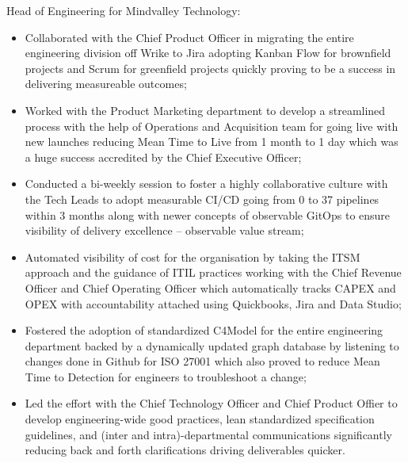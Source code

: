 \documentclass[11pt,a4paper,nolmodern,colorlinks=true,linkcolor=true]{moderncv}
\begin{document}
%
  {Head of Engineering for Mindvalley Technology:
    \begin{itemize}
      \item Collaborated with the Chief Product Officer in migrating the entire engineering division off Wrike to Jira adopting Kanban Flow for brownfield projects and Scrum for greenfield projects quickly proving to be a success in delivering measureable outcomes;
      \item Worked with the Product Marketing department to develop a streamlined process with the help of Operations and Acquisition team for going live with new launches reducing Mean Time to Live from 1 month to 1 day which was a huge success accredited by the Chief Executive Officer;
      \item Conducted a bi-weekly session to foster a highly collaborative culture with the Tech Leads to adopt measurable CI/CD going from 0 to 37 pipelines within 3 months along with newer concepts of observable GitOps to ensure visibility of delivery excellence -- observable value stream;
      \item Automated visibility of cost for the organisation by taking the ITSM approach and the guidance of ITIL practices working with the Chief Revenue Officer and Chief Operating Officer which automatically tracks CAPEX and OPEX with accountability attached using Quickbooks, Jira and Data Studio;
      \item Fostered the adoption of standardized C4Model for the entire engineering department backed by a dynamically updated graph database by listening to changes done in Github for ISO 27001 which also proved to reduce Mean Time to Detection for engineers to troubleshoot a change;
      \item Led the effort with the Chief Technology Officer and Chief Product Offier to develop engineering-wide good practices, lean standardized specification guidelines, and (inter and intra)-departmental communications significantly reducing back and forth clarifications driving deliverables quicker.
    \end{itemize}
}
\end{document}
